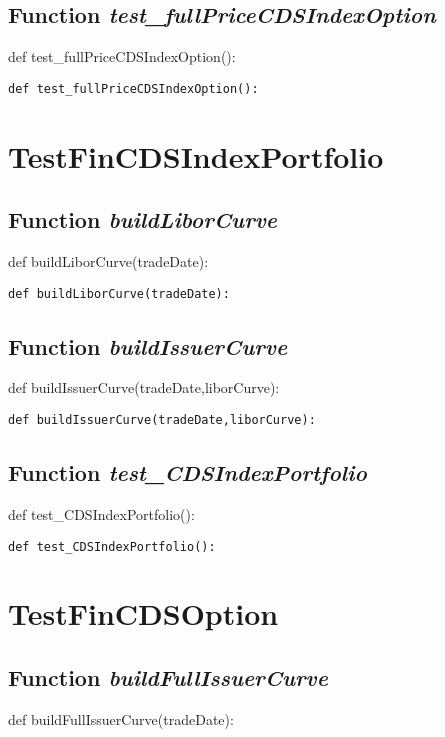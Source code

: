 \documentclass[twoside,11pt]{book}
\begin{document}
\subsection{Function {\it test\_fullPriceCDSIndexOption}}
def test\_fullPriceCDSIndexOption():

\begin{lstlisting}
def test_fullPriceCDSIndexOption():
\end{lstlisting}


\newpage
\section{TestFinCDSIndexPortfolio}

\subsection{Function {\it buildLiborCurve}}
def buildLiborCurve(tradeDate):

\begin{lstlisting}
def buildLiborCurve(tradeDate):
\end{lstlisting}

\subsection{Function {\it buildIssuerCurve}}
def buildIssuerCurve(tradeDate,liborCurve):

\begin{lstlisting}
def buildIssuerCurve(tradeDate,liborCurve):
\end{lstlisting}

\subsection{Function {\it test\_CDSIndexPortfolio}}
def test\_CDSIndexPortfolio():

\begin{lstlisting}
def test_CDSIndexPortfolio():
\end{lstlisting}


\newpage
\section{TestFinCDSOption}

\subsection{Function {\it buildFullIssuerCurve}}
def buildFullIssuerCurve(tradeDate):
\end{document}
